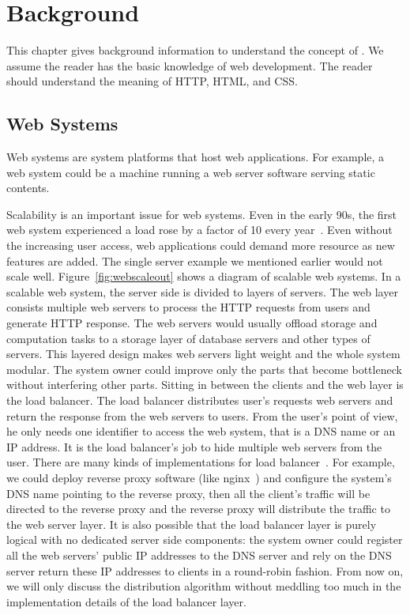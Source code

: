 \chapter{Background}

This chapter gives background information to understand the concept of \cbtwo.
We assume the reader has the basic knowledge of web development.
The reader should understand the meaning of HTTP, HTML, \js and CSS.

\webscaleoutfig{}

\section{Web Systems}
\label{sec:websys}

Web systems are system platforms that host web applications.
For example, a web system could be a machine running a web
server software serving static contents.

Scalability is an important issue for web systems.
Even in the early 90s, the first web system experienced a load rose by a factor
of 10 every year~\cite{berners1998world}.
Even without the increasing user access,
web applications could demand more resource as new features are added.
The single server example we mentioned earlier would not scale well.
Figure~\ref{fig:webscaleout} shows a diagram of scalable web systems.
In a scalable web system, the server side is divided to layers of servers.
The web layer consists multiple web servers to process the HTTP requests from users
and generate HTTP response.
The web servers would usually offload storage and computation tasks to a storage layer
of database servers and other types of servers.
This layered design makes web servers light weight and the whole system modular.
The system owner could improve only the parts that become bottleneck without interfering
other parts.
Sitting in between the clients and the web layer is the load balancer.
The load balancer distributes user's requests web servers
and return the response from the web servers to users.
From the user's point of view, he only needs one identifier to
access the web system, that is a DNS name or an IP address.
It is the load balancer's job to hide multiple web servers from the user.
There are many kinds of implementations for load balancer~\cite{cardellini2002state}.
For example, we could deploy reverse proxy software (like nginx~\cite{nginx})
and configure the system's DNS name pointing to the reverse proxy,
then all the client's traffic will be directed to the reverse proxy
and the reverse proxy will distribute the traffic to the web server layer.
It is also possible that the load balancer layer is purely logical with no
dedicated server side components:
the system owner could register all the web servers' public IP addresses to the DNS server
and rely on the DNS server return these IP addresses to clients in a round-robin
fashion.
From now on, we will only discuss the distribution algorithm without meddling too much
in the implementation details of the load balancer layer.


